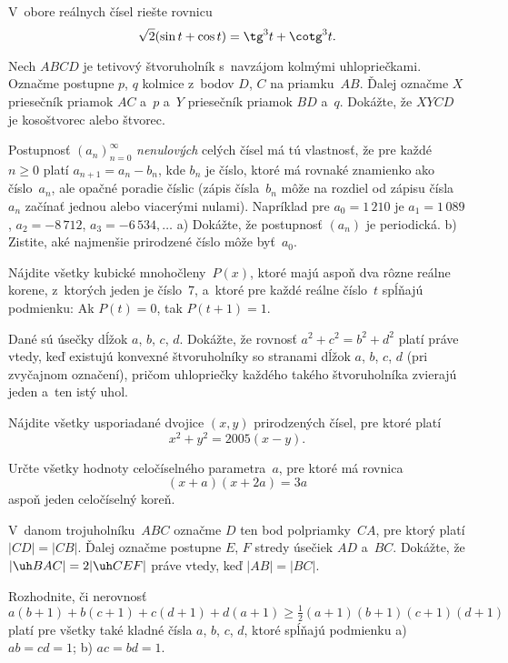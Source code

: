 ﻿{%
V~obore reálnych čísel riešte rovnicu
$$
\sqrt{2}(\sin t+\cos t)=\tg^3 t+\cotg^3 t.
$$}

{%
Nech $ABCD$ je tetivový štvoruholník s~navzájom kolmými uhlopriečkami.
Označme postupne $p$, $q$ kolmice z~bodov $D$,
$C$ na priamku~$AB$. Ďalej označme $X$ priesečník priamok $AC$ a~$p$
a~$Y$ priesečník priamok $BD$ a~$q$. Dokážte, že $XYCD$ je
kosoštvorec alebo štvorec.}

{%
Postupnosť $(a_n)_{n=0}^{\infty}$ {\it nenulových\/}
celých čísel má tú vlastnosť, že pre každé $n\ge0$ platí $a_{n+1}=a_n-b_n$,
kde $b_n$ je číslo, ktoré má rovnaké znamienko ako číslo~$a_n$, ale
opačné poradie číslic (zápis čísla~$b_n$ môže na rozdiel od zápisu čísla~$a_n$ začínať
jednou alebo viacerými nulami).
Napríklad pre $a_0=1\,210$ je $a_1=1\,089$, $a_2={-}8\,712$,
$a_3={-}6\,534,\dots$
\ite a) Dokážte, že postupnosť $(a_n)$ je periodická.
\ite b) Zistite, aké najmenšie prirodzené číslo môže byť~$a_0$.}

{%
Nájdite všetky kubické mnohočleny~$P(x)$, ktoré majú aspoň dva rôzne reálne korene,
z~ktorých jeden je číslo~7, a~ktoré pre každé reálne číslo~$t$
spĺňajú podmienku: Ak $P(t)=0$, tak $P(t+1)=1$.}

{%
Dané sú úsečky dĺžok $a$, $b$, $c$, $d$. Dokážte, že rovnosť $a^2+c^2=b^2+d^2$
platí práve vtedy, keď existujú konvexné
štvoruholníky so stranami dĺžok $a$, $b$, $c$, $d$ (pri
zvyčajnom označení), pričom uhlopriečky každého takého štvoruholníka
zvierajú jeden a~ten istý uhol.}

{%
Nájdite všetky usporiadané dvojice $(x,y)$ prirodzených čísel, pre
ktoré platí
$$
x^2+y^2=2005(x-y).
$$}

{%
Určte všetky hodnoty celočíselného parametra~$a$, pre ktoré má rovnica
$$
(x+a)(x+2a)=3a
$$
aspoň jeden celočíselný koreň.}

{%
V~danom trojuholníku~$ABC$ označme $D$ ten bod polpriamky~$CA$, pre ktorý platí $|CD|=|CB|$.
Ďalej označme postupne $E$, $F$ stredy úsečiek $AD$ a~$BC$. Dokážte, že $|\uh BAC|=2|\uh CEF|$
práve vtedy, keď $|AB|=|BC|$.}

{%
Rozhodnite, či nerovnosť
$$
a(b+1)+b(c+1)+c(d+1)+d(a+1)\ge\tfrac12(a+1)(b+1)(c+1)(d+1)
$$
platí pre všetky také kladné čísla $a$, $b$, $c$, $d$, ktoré spĺňajú podmienku
\ite a) $ab=cd=1$;
\ite b) $ac=bd=1$.}

